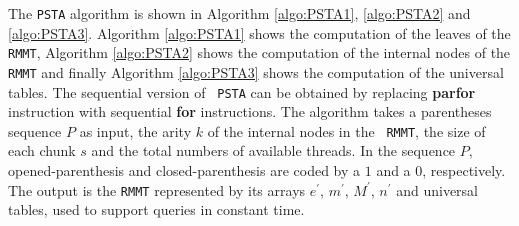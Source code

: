The {\tt PSTA} algorithm is shown in Algorithm \ref{algo:PSTA1},
\ref{algo:PSTA2} and \ref{algo:PSTA3}. Algorithm \ref{algo:PSTA1}
shows the computation of the leaves of the {\tt RMMT}, Algorithm
\ref{algo:PSTA2} shows the computation of the internal nodes of the
{\tt RMMT} and finally Algorithm \ref{algo:PSTA3} shows the
computation of the universal tables. The sequential version of {\tt
  PSTA} can be obtained by replacing {\bf parfor} instruction with
sequential {\bf for} instructions. The algorithm takes a parentheses
sequence $P$ as input, the arity $k$ of the internal nodes in the {\tt
  RMMT}, the size of each chunk $s$ and the total numbers of available
threads. In the sequence $P$, opened-parenthesis and
closed-parenthesis are coded by a $1$ and a $0$, respectively. The
output is the {\tt RMMT} represented by its arrays $e^{\prime}$,
$m^{\prime}$, $M^{\prime}$, $n^{\prime}$ and universal tables, used to
support queries in constant time.

